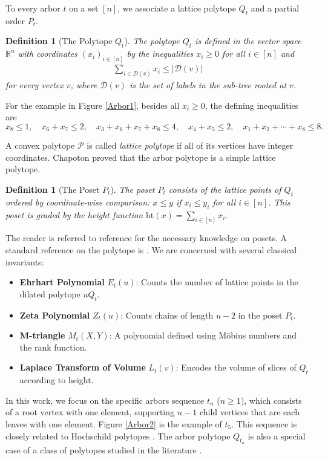 \documentclass[reqno, 12pt]{article}
\theoremstyle{mydefinition}
\newtheorem{dfn}[thm]{Definition}
\theoremstyle{myremark}
\begin{document}
To every arbor $t$ on a set $[n]$, we associate a lattice polytope $Q_t$ and a partial order $P_t$.

\begin{dfn}[The Polytope $Q_t$]
The polytope $Q_t$ is defined in the vector space $\mathbb{R}^n$ with coordinates $(x_i)_{i \in [n]}$ by the inequalities $x_i \ge 0$ for all $i \in [n]$ and 
\begin{align*}
\sum_{i \in \mathcal{D}(v)} x_i \le |\mathcal{D}(v)|
\end{align*}
for every vertex $v$, where $\mathcal{D}(v)$ is the set of labels in the sub-tree rooted at $v$.
\end{dfn}

For the example in Figure \ref{Arbor1}, besides all $x_i\geq 0$, the defining inequalities are 
$$x_8\leq 1, \quad x_6+x_7\leq 2, \quad x_3+x_6+x_7+x_8\leq 4, \quad x_4+x_5\leq 2,\quad x_1+x_2+\cdots +x_8\leq 8.$$

A convex polytope $\mathcal{P}$ is called \emph{lattice polytope} if all of its vertices have integer coordinates.
Chapoton \cite[Lemma 1.2]{Chapoton} proved that the arbor polytope is a simple lattice polytope.


\begin{dfn}[The Poset $P_t$]
The poset $P_t$ consists of the lattice points of $Q_t$ ordered by coordinate-wise comparison: $x \le y$ if $x_i \le y_i$ for all $i \in [n]$. This poset is graded by the height function $\mathrm{ht}(x) = \sum_{i \in [n]} x_i$.
\end{dfn}

The reader is referred to reference \cite[Section 3]{RP.Stanley} for the necessary knowledge on posets.
A standard reference on the polytope is \cite{BeckRobins}.
We are concerned with several classical invariants:
\begin{itemize}
    \item \textbf{Ehrhart Polynomial} $E_t(u)$: Counts the number of lattice points in the dilated polytope $uQ_t$.
    \item \textbf{Zeta Polynomial} $Z_t(u)$: Counts chains of length $u-2$ in the poset $P_t$.
    \item \textbf{M-triangle} $M_t(X, Y)$: A polynomial defined using M\"obius numbers and the rank function.
    \item \textbf{Laplace Transform of Volume} $L_t(v)$: Encodes the volume of slices of $Q_t$ according to height.
\end{itemize}


In this work, we focus on the specific arbors sequence $t_n$ ($n \ge 1$), which consists of a root vertex with one element, supporting $n-1$ child vertices that are each leaves with one element. Figure \ref{Arbor2} is the example of $t_5$. This sequence is closely related to Hochschild polytopes \cite{Combe21,Rivera-Saneb}.
The arbor polytope $Q_{t_n}$ is also a special case of a class of polytopes studied in the literature \cite{Athanasiadis-Xiao-Yan}.
\end{document}

